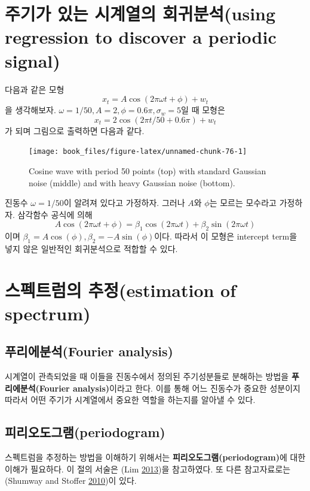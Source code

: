 \documentclass[b5paper,]{book}
\theoremstyle{definition}
\theoremstyle{definition}
\theoremstyle{definition}
\theoremstyle{remark}
\begin{document}
\section{주기가 있는 시계열의 회귀분석(using regression to discover a
periodic
signal)}\label{---using-regression-to-discover-a-periodic-signal}

다음과 같은 모형 \[x_{t}=A\cos (2\pi\omega t + \phi) + w_{t}\] 을
생각해보자. \(\omega=1/50, A=2,\phi=0.6\pi, \sigma_{w}=5\)일 때 모형은
\[x_{t}=2\cos (2\pi t /50 + 0.6 \pi) + w_{t}\] 가 되며 그림으로 출력하면
다음과 같다.

\begin{figure}

{\centering \texttt{[image: book\_files/figure-latex/unnamed-chunk-76-1]} 

}

\caption{Cosine wave with period 50 points (top) with standard Gaussian noise (middle) and with heavy Gaussian noise (bottom).}\label{fig:unnamed-chunk-76}
\end{figure}

진동수 \(\omega=1/50\)이 알려져 있다고 가정하자. 그러나 \(A\)와
\(\phi\)는 모르는 모수라고 가정하자. 삼각함수 공식에 의해
\[A\cos (2\pi \omega t + \phi)=\beta_{1}\cos (2\pi \omega t) + \beta_{2}\sin (2\pi\omega t)\]
이며 \(\beta_{1}=A\cos(\phi), \beta_{2}=-A\sin(\phi)\)이다. 따라서 이
모형은 intercept term을 넣지 않은 일반적인 회귀분석으로 적합할 수 있다.

\section{스펙트럼의 추정(estimation of
spectrum)}\label{-estimation-of-spectrum}

\subsection{푸리에분석(Fourier analysis)}\label{fourier-analysis}

시계열이 관측되었을 때 이들을 진동수에서 정의된 주기성분들로 분해하는
방법을 \textbf{푸리에분석(Fourier analysis)}이라고 한다. 이를 통해 어느
진동수가 중요한 성분이지 따라서 어떤 주기가 시계열에서 중요한 역할을
하는지를 알아낼 수 있다.

\subsection{피리오도그램(periodogram)}\label{periodogram}

스펙트럼을 추정하는 방법을 이해하기 위해서는
\textbf{피리오도그램(periodogram)}에 대한 이해가 필요하다. 이 절의
서술은 (Lim \protect\hyperlink{ref-Lim2013}{2013})을 참고하였다. 또 다른
참고자료로는 (Shumway and Stoffer
\protect\hyperlink{ref-Shumway2010}{2010})이 있다.
\end{document}
